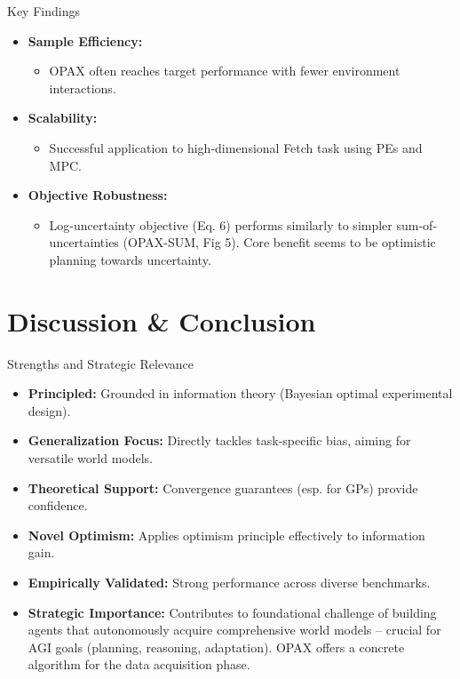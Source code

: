 \documentclass[11pt,aspectratio=169]{beamer}
\begin{document}
\begin{frame}{Key Findings}
    \begin{itemize}
        \item \textbf{Sample Efficiency:}
        \begin{itemize}
            \item OPAX often reaches target performance with fewer environment interactions.
        \end{itemize}
        \pause
        \item \textbf{Scalability:}
        \begin{itemize}
            \item Successful application to high-dimensional Fetch task using PEs and MPC.
        \end{itemize}
        \pause
        \item \textbf{Objective Robustness:}
        \begin{itemize}
            \item Log-uncertainty objective (Eq. 6) performs similarly to simpler sum-of-uncertainties (OPAX-SUM, Fig 5). Core benefit seems to be optimistic planning towards uncertainty.
        \end{itemize}
    \end{itemize}
\end{frame}

\section{Discussion \& Conclusion}

\begin{frame}{Strengths and Strategic Relevance}
    \begin{itemize}
        \item \textbf{Principled:} Grounded in information theory (Bayesian optimal experimental design).
        \item \textbf{Generalization Focus:} Directly tackles task-specific bias, aiming for versatile world models.
        \item \textbf{Theoretical Support:} Convergence guarantees (esp. for GPs) provide confidence.
        \item \textbf{Novel Optimism:} Applies optimism principle effectively to information gain.
        \item \textbf{Empirically Validated:} Strong performance across diverse benchmarks.
        \pause
        \item \textbf{Strategic Importance:} Contributes to foundational challenge of building agents that autonomously acquire comprehensive world models – crucial for AGI goals (planning, reasoning, adaptation). OPAX offers a concrete algorithm for the data acquisition phase.
    \end{itemize}
\end{frame}
\end{document}
